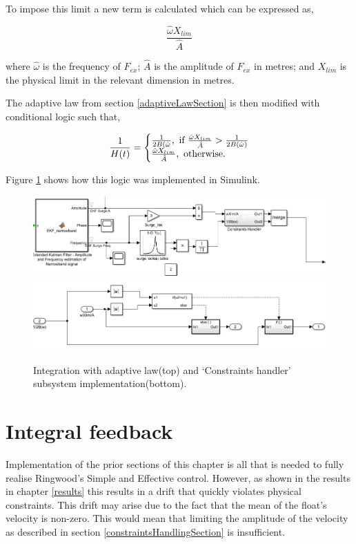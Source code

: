 \documentclass{report}
\begin{document}
To impose this limit a new term is calculated which can be expressed as, 

\[
\frac{\hat{\omega}X_{lim}}{\hat{A}}
\]

where $\hat{\omega}$ is the frequency of $F_{ex}$; $\hat{A}$ is the amplitude of $F_{ex}$ in metres; and $X_{lim}$ is the physical limit in the relevant dimension in metres.

The adaptive law from section \ref{adaptiveLawSection} is then modified with conditional logic such that,

\[
\frac{1}{H(t)} = 
\left\{\begin{matrix*}[l]
\frac{1}{2B(\hat{\omega}}, \textup{ if } \frac{\hat{\omega}X_{lim}}{\hat{A}}>\frac{1}{2B(\hat{\omega})}\\
\frac{\hat{\omega}X_{lim}}{\hat{A}}, \textup{ otherwise.}\\
\end{matrix*}\right.
\]

Figure \ref{velocityConstraints} shows how this logic was implemented in Simulink.
\FloatBarrier
\begin{figure}

\centering
\includegraphics[scale=0.5]{graphics/constraintsTop}
\includegraphics[scale=0.5]{graphics/constraintsBottom}
\caption{Integration with adaptive law(top) and `Constraints handler' subsystem implementation(bottom).}
\label{velocityConstraints}
\end{figure}

\FloatBarrier
\section{Integral feedback}

Implementation of the prior sections of this chapter is all that is needed to fully realise Ringwood's Simple and Effective control. However, as shown in the results in chapter \ref{results} this results in a drift that quickly violates physical constraints. This drift may arise due to the fact that the mean of the float's velocity is non-zero. This would mean that limiting the amplitude of the velocity as described in section \ref{constraintsHandlingSection} is insufficient.
\end{document}
